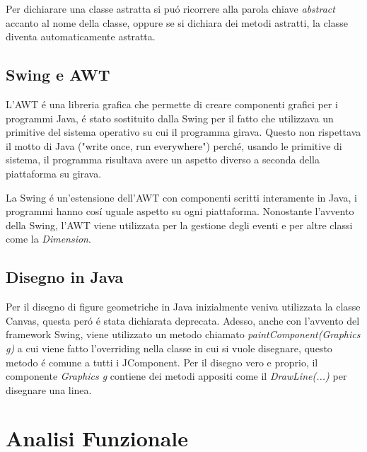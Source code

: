 \documentclass[a4paper,12pt,times,numbered,print,index]{article}
\begin{document}
Per dichiarare una classe astratta si puó ricorrere alla parola chiave \textit{abstract} accanto al nome della classe, oppure se si dichiara dei metodi astratti, la classe diventa automaticamente astratta.
\textcite{astratta}

\subsection{Swing e AWT}
L'AWT é una libreria grafica che permette di creare componenti grafici per i programmi Java, é stato sostituito dalla Swing per il fatto che utilizzava un primitive del sistema operativo su cui il programma girava. Questo non rispettava il motto di Java ("write once, run everywhere") perché, usando le primitive di sistema, il programma risultava avere un aspetto diverso a seconda della piattaforma su girava.

La Swing é un'estensione dell'AWT con componenti scritti interamente in Java, i programmi hanno cosí uguale aspetto su ogni piattaforma. Nonostante l'avvento della Swing, l'AWT viene utilizzata per la gestione degli eventi e per altre classi come la \textit{Dimension}.

\subsection{Disegno in Java}
Per il disegno di figure geometriche in Java inizialmente veniva utilizzata la classe Canvas, questa peró é stata dichiarata deprecata. Adesso, anche con l'avvento del framework Swing, viene utilizzato un metodo chiamato \textit{paintComponent(Graphics g)} a cui viene fatto l'overriding nella classe in cui si vuole disegnare, questo metodo é comune a tutti i JComponent. Per il disegno vero e proprio, il componente \textit{Graphics g} contiene dei metodi appositi come il \textit{DrawLine(...)} per disegnare una linea. 

\section{Analisi Funzionale}
\end{document}
